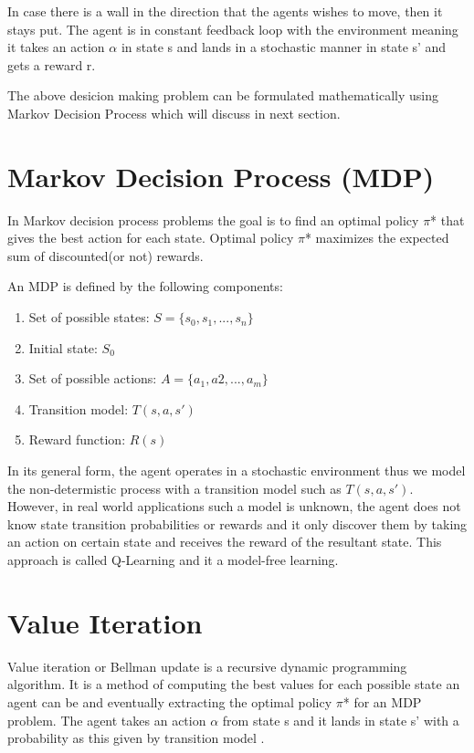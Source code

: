 \documentclass[10pt,a4paper,twocolumn]{article}
\begin{document}
	In case there is a wall in the direction that the agents wishes to move, then it stays put.
	The agent is in constant feedback loop with the environment meaning it takes an action $\alpha$ in state s and lands in a stochastic manner in state s’ and gets a reward r.
	
	The above desicion making problem can be formulated mathematically using Markov Decision Process which will discuss in next section.
	
	\section{Markov Decision Process (MDP)}
	
	In Markov decision process problems the goal is to find an optimal policy $\pi$* that gives  the best action for each state. Optimal policy $\pi$* maximizes the expected sum of discounted(or not) rewards.
	
	An MDP is defined by the following components:
	\begin{enumerate}
		\item Set of possible states: $S = \{ s_{0}, s_{1}, ..., s_{n} \}$
		\item Initial state: $S_{0}$
		\item Set of possible actions: $A = \{ a_{1}, a{2}, ..., a_{m} \}$
		\item Transition model: $T(s, a, s')$
		\item Reward function: $R(s)$
	\end{enumerate}

	In its general form, the agent operates in a stochastic environment thus we model the non-determistic process with a transition model such as $T(s,a,s')$. However, in real world applications such a model is unknown, the agent does not know state transition probabilities or rewards and it only discover them by taking an action on certain state and receives the reward of the resultant state. This approach is called Q-Learning and it a model-free learning.
	
	\section{Value Iteration}
	Value iteration or Bellman update is a recursive dynamic programming algorithm. It is a method of computing the best values for each possible state an agent can be and eventually extracting the optimal policy $\pi$* for an MDP problem. The agent takes an action $\alpha$ from state s and it lands in state s’ with a probability as this given by transition model . 
	
\end{document}
